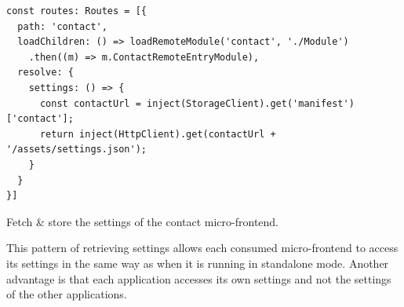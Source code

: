 \ifshowListings
\begin{listing}[H]
\begin{verbatim}
const routes: Routes = [{
  path: 'contact',
  loadChildren: () => loadRemoteModule('contact', './Module')
    .then((m) => m.ContactRemoteEntryModule),
  resolve: {
    settings: () => {
      const contactUrl = inject(StorageClient).get('manifest')['contact'];
      return inject(HttpClient).get(contactUrl + '/assets/settings.json');
    }
  }
}]
\end{verbatim}
\caption{Fetch \& store the settings of the contact micro-frontend.}\label{code:applied-methods:fetch-and-store-remote-application-settings}
\end{listing}
\fi

\noindent This pattern of retrieving settings allows each consumed micro-frontend to access its settings in the same way as when it is running in standalone mode. Another advantage is that each application accesses its own settings and not the settings of the other applications. 
